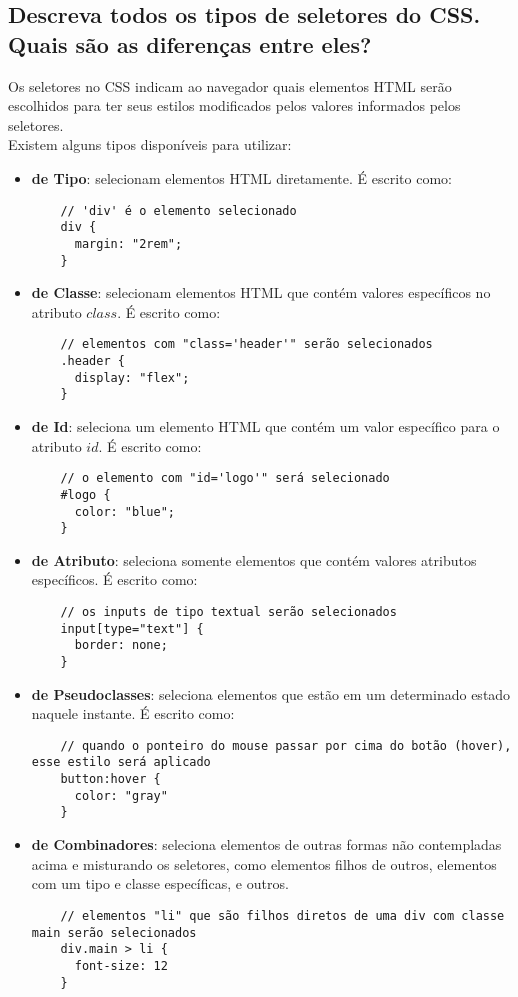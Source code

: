 \subsection{Descreva todos os tipos de seletores do CSS. Quais são as diferenças entre eles?}
Os seletores no CSS indicam ao navegador quais elementos HTML serão escolhidos para ter seus estilos modificados pelos valores informados pelos seletores. \\
Existem alguns tipos disponíveis para utilizar:
\begin{itemize}
  \item \textbf{de Tipo}: selecionam elementos HTML diretamente. É escrito como:
  \begin{verbatim}
    // 'div' é o elemento selecionado 
    div { 
      margin: "2rem";
    }
  \end{verbatim}
  \item \textbf{de Classe}: selecionam elementos HTML que contém valores específicos no atributo $class$. É escrito como:
  \begin{verbatim}
    // elementos com "class='header'" serão selecionados
    .header { 
      display: "flex";
    }
  \end{verbatim}
  \item \textbf{de Id}: seleciona um elemento HTML que contém um valor específico para o atributo $id$. É escrito como:
  \begin{verbatim}
    // o elemento com "id='logo'" será selecionado 
    #logo { 
      color: "blue"; 
    }
  \end{verbatim}
  \item \textbf{de Atributo}: seleciona somente elementos que contém valores atributos específicos. É escrito como:
  \begin{verbatim}
    // os inputs de tipo textual serão selecionados
    input[type="text"] { 
      border: none;
    }
  \end{verbatim}
  \item \textbf{de Pseudoclasses}: seleciona elementos que estão em um determinado estado naquele instante. É escrito como:
  \begin{verbatim}
    // quando o ponteiro do mouse passar por cima do botão (hover), esse estilo será aplicado
    button:hover { 
      color: "gray"
    }
  \end{verbatim}
  \item \textbf{de Combinadores}: seleciona elementos de outras formas não contempladas acima e misturando os seletores, como elementos filhos de outros, elementos com um tipo e classe específicas, e outros.
  \begin{verbatim}
    // elementos "li" que são filhos diretos de uma div com classe main serão selecionados
    div.main > li { 
      font-size: 12
    }
  \end{verbatim}
\end{itemize}
